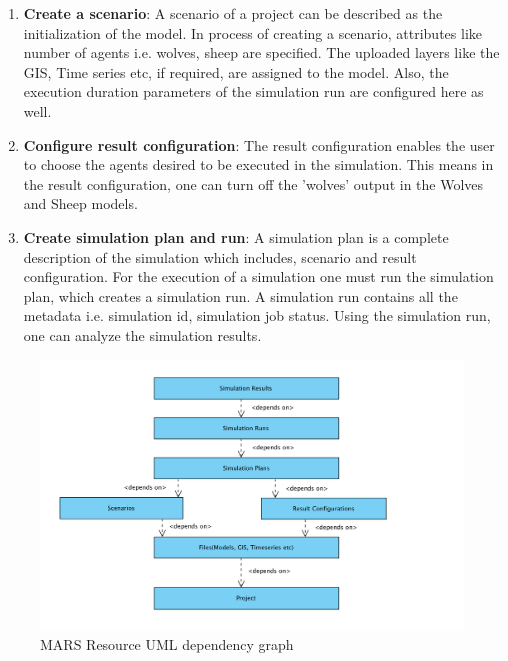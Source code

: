 \begin{enumerate}
            \item 
                \textbf{Create a scenario}: A scenario of a project can be described as the initialization of the model.
                In process of creating a scenario, attributes like number of agents i.e. wolves, sheep are specified. 
                The uploaded layers like the GIS, Time series etc, if required, are assigned to the model. Also,
                the execution duration parameters of the simulation run are configured here as well.

            \item 
                \textbf{Configure result configuration}: The result configuration enables the user to choose
                the agents desired to be executed in the simulation. This means in the result 
                configuration, one can turn off the 'wolves' output in the Wolves and Sheep models.
            \item  
                \textbf{Create simulation plan and run}: A simulation plan is a complete description of the
                 simulation which includes, scenario and result configuration. For the execution of a simulation
                 one must run the simulation plan, which creates
                 a simulation run. A simulation run contains all the metadata i.e. simulation id, simulation 
                 job status. Using the simulation run, one can analyze the 
                 simulation results.
        \end{enumerate} 
        
        \begin{figure}[H]
            \centering \includegraphics[scale=0.6]{grafiken/marsDependency.png}
            \caption{MARS Resource UML dependency graph}
            \label{fig:marsDependency}
        \end{figure}
        
